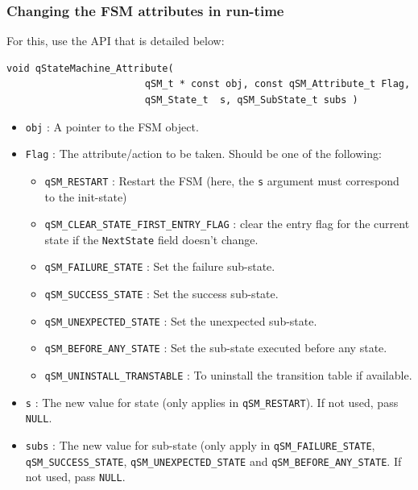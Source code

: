 \documentclass{article}
\begin{document}
\subsubsection{Changing the FSM attributes in run-time}
For this, use the API  that is detailed below:\\

\begin{lstlisting}[style=CStyle]
void qStateMachine_Attribute( 
                        qSM_t * const obj, const qSM_Attribute_t Flag, 
                        qSM_State_t  s, qSM_SubState_t subs )
\end{lstlisting}

\begin{itemize}
    \item \lstinline{obj} : A pointer to the FSM object.
    \item \lstinline{Flag} : The attribute/action to be taken. Should be one of the following:
    \begin{itemize}
        \item \lstinline{qSM_RESTART} : Restart the FSM (here, the \lstinline{s} argument must correspond to the init-state)
        \item \lstinline{qSM_CLEAR_STATE_FIRST_ENTRY_FLAG} : clear the entry flag for the current state if the \lstinline{NextState} field doesn't change.
        \item \lstinline{qSM_FAILURE_STATE} : Set the failure sub-state.
        \item \lstinline{qSM_SUCCESS_STATE} : Set the success sub-state.
        \item \lstinline{qSM_UNEXPECTED_STATE} : Set the unexpected sub-state.
        \item \lstinline{qSM_BEFORE_ANY_STATE} : Set the sub-state executed before any state.
        \item \lstinline{qSM_UNINSTALL_TRANSTABLE} : To uninstall the transition table if available.
    \end{itemize}
    \item \lstinline{s} : The new value for state (only applies in \lstinline{qSM_RESTART}). If not used, pass \lstinline{NULL}.
    \item \lstinline{subs} : The new value for sub-state (only apply in \lstinline{qSM_FAILURE_STATE}, \lstinline{qSM_SUCCESS_STATE}, \lstinline{qSM_UNEXPECTED_STATE} and \lstinline{qSM_BEFORE_ANY_STATE}. If not used, pass \lstinline{NULL}.
\end{itemize}
\end{document}
